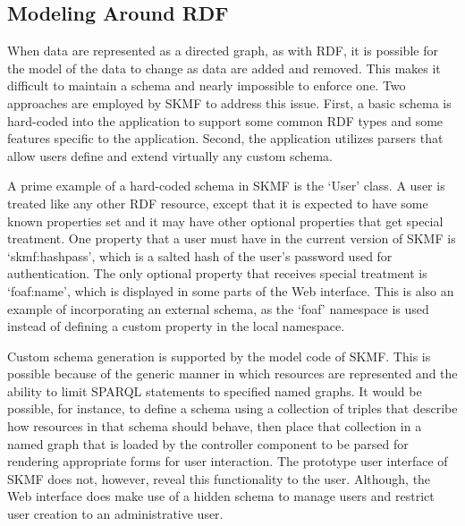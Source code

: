 \subsection{Modeling Around RDF}
\label{method:orm}

When data are represented as a directed graph, as with RDF, it is possible for the model of the data to change as data are added and removed. This makes it difficult to maintain a schema and nearly impossible to enforce one. Two approaches are employed by SKMF to address this issue. First, a basic schema is hard-coded into the application to support some common RDF types and some features specific to the application. Second, the application utilizes parsers that allow users define and extend virtually any custom schema.

A prime example of a hard-coded schema in SKMF is the `User' class. A user is treated like any other RDF resource, except that it is expected to have some known properties set and it may have other optional properties that get special treatment. One property that a user must have in the current version of SKMF is `skmf:hashpass', which is a salted hash of the user's password used for authentication. The only optional property that receives special treatment is `foaf:name', which is displayed in some parts of the Web interface. This is also an example of incorporating an external schema, as the `foaf' namespace is used instead of defining a custom property in the local namespace.

Custom schema generation is supported by the model code of SKMF. This is possible because of the generic manner in which resources are represented and the ability to limit SPARQL statements to specified named graphs. It would be possible, for instance, to define a schema using a collection of triples that describe how resources in that schema should behave, then place that collection in a named graph that is loaded by the controller component to be parsed for rendering appropriate forms for user interaction. The prototype user interface of SKMF does not, however, reveal this functionality to the user. Although, the Web interface does make use of a hidden schema to manage users and restrict user creation to an administrative user.

